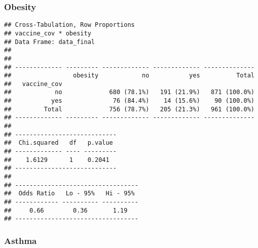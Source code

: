 \documentclass[
]{article}
\newenvironment{Shaded}{\begin{snugshade}}{\end{snugshade}}
\newcommand{\AttributeTok}[1]{\textcolor[rgb]{0.77,0.63,0.00}{#1}}
\newcommand{\ConstantTok}[1]{\textcolor[rgb]{0.00,0.00,0.00}{#1}}
\newcommand{\FunctionTok}[1]{\textcolor[rgb]{0.00,0.00,0.00}{#1}}
\newcommand{\NormalTok}[1]{#1}
\newcommand{\SpecialCharTok}[1]{\textcolor[rgb]{0.00,0.00,0.00}{#1}}
\newcommand{\StringTok}[1]{\textcolor[rgb]{0.31,0.60,0.02}{#1}}
\begin{document}
\hypertarget{obesity}{%
\subsubsection{Obesity}\label{obesity}}

\begin{Shaded}
\end{Shaded}

\begin{verbatim}
## Cross-Tabulation, Row Proportions  
## vaccine_cov * obesity  
## Data Frame: data_final  
## 
## 
## ------------- --------- ------------- ------------- --------------
##                 obesity            no           yes          Total
##   vaccine_cov                                                     
##            no             680 (78.1%)   191 (21.9%)   871 (100.0%)
##           yes              76 (84.4%)    14 (15.6%)    90 (100.0%)
##         Total             756 (78.7%)   205 (21.3%)   961 (100.0%)
## ------------- --------- ------------- ------------- --------------
## 
## ----------------------------
##  Chi.squared   df   p.value 
## ------------- ---- ---------
##    1.6129      1    0.2041  
## ----------------------------
## 
## ----------------------------------
##  Odds Ratio   Lo - 95%   Hi - 95% 
## ------------ ---------- ----------
##     0.66        0.36       1.19   
## ----------------------------------
\end{verbatim}

\hypertarget{asthma}{%
\subsubsection{Asthma}\label{asthma}}

\begin{Shaded}
\end{Shaded}
\end{document}

